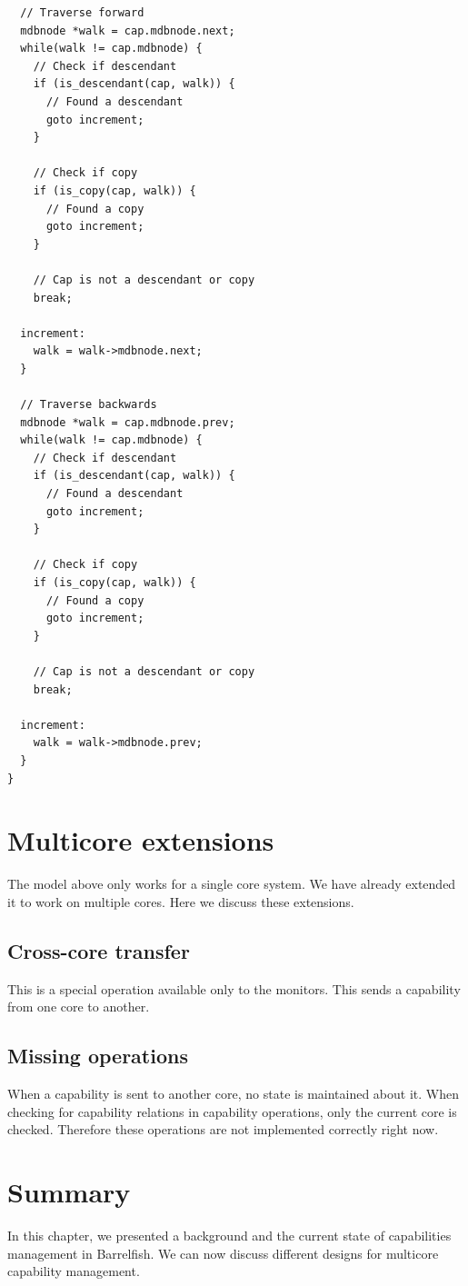 \documentclass[a4paper,twoside]{report} %
\begin{document}
{\scriptsize
\begin{verbatim}
  // Traverse forward
  mdbnode *walk = cap.mdbnode.next;
  while(walk != cap.mdbnode) {
    // Check if descendant
    if (is_descendant(cap, walk)) {
      // Found a descendant
      goto increment;
    }

    // Check if copy
    if (is_copy(cap, walk)) {
      // Found a copy
      goto increment;
    }

    // Cap is not a descendant or copy
    break;

  increment:
    walk = walk->mdbnode.next;
  }

  // Traverse backwards
  mdbnode *walk = cap.mdbnode.prev;
  while(walk != cap.mdbnode) {
    // Check if descendant
    if (is_descendant(cap, walk)) {
      // Found a descendant
      goto increment;
    }

    // Check if copy
    if (is_copy(cap, walk)) {
      // Found a copy
      goto increment;
    }

    // Cap is not a descendant or copy
    break;

  increment:
    walk = walk->mdbnode.prev;
  }
}
\end{verbatim}
}

\section{Multicore extensions}
The model above only works for a single core system. We have already
extended it to work on multiple cores. Here we discuss these
extensions.

\subsection{Cross-core transfer}
This is a special operation available only to the monitors. This sends
a capability from one core to another.

\subsection{Missing operations}
When a capability is sent to another core, no state is maintained
about it. When checking for capability relations in capability
operations, only the current core is checked. Therefore these
operations are not implemented correctly right now.

\section{Summary}
In this chapter, we presented a background and the current state of
capabilities management in Barrelfish. We can now discuss different
designs for multicore capability management.
\end{document}
